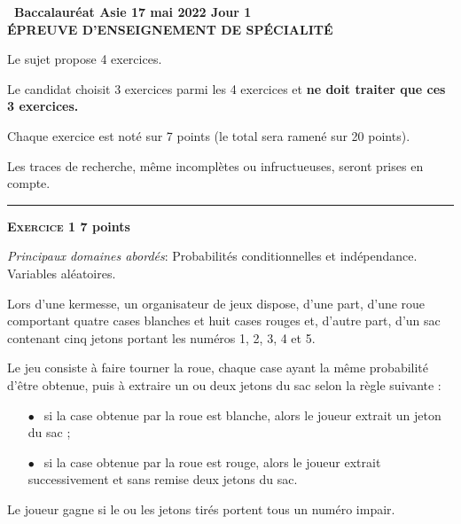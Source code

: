 \documentclass[10pt,a4paper]{article}
\begin{document}
\label{Asie1}

\pagestyle{fancy}
\thispagestyle{empty}

\begin{center}{\Large\textbf{\decofourleft~Baccalauréat Asie 17 mai 2022 Jour 1~\decofourright\\[6pt] ÉPREUVE D'ENSEIGNEMENT DE SPÉCIALITÉ}}

\vspace{0,25cm}

Le sujet propose 4 exercices.

Le candidat choisit 3 exercices parmi les 4 exercices et \textbf{ne doit traiter que ces 3 exercices.}

\medskip

Chaque exercice est noté sur 7 points (le total sera ramené sur 20 points). 

\medskip

Les traces de recherche, même incomplètes ou infructueuses, seront prises en compte.

\hrule
\end{center}

\bigskip

\textbf{\textsc{Exercice 1} \hfill 7 points}

\medskip

\emph{Principaux domaines abordés}: Probabilités conditionnelles et indépendance. Variables aléatoires.

\medskip

Lors d'une kermesse, un organisateur de jeux dispose, d'une part, d'une roue comportant quatre cases blanches et huit cases rouges et, d'autre part, d'un sac contenant cinq jetons portant les numéros 1, 2, 3, 4 et 5.

Le jeu consiste à faire tourner la roue, chaque case ayant la même probabilité d'être obtenue, puis à extraire un ou deux jetons du sac selon la règle suivante :

\setlength\parindent{1cm}
\begin{itemize}
\item[$\bullet~~$] si la case obtenue par la roue est blanche, alors le joueur extrait un jeton du sac ;
\item[$\bullet~~$] si la case obtenue par la roue est rouge, alors le joueur extrait successivement et sans remise deux jetons du sac.
\end{itemize}
\setlength\parindent{0cm}

Le joueur gagne si le ou les jetons tirés portent tous un numéro impair.
\end{document}
